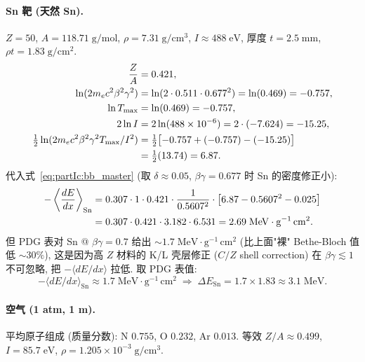 \paragraph{Sn 靶 (天然 Sn).} $Z = 50$, $A = 118.71\;\mathrm{g/mol}$, $\rho = 7.31\;\mathrm{g/cm^3}$, $I \approx 488\;\mathrm{eV}$, 厚度 $t = 2.5\;\mathrm{mm}$, $\rho t = 1.83\;\mathrm{g/cm^2}$.
\begin{align}
  \frac{Z}{A} &= 0.421, \\
  \ln(2 m_e c^2 \beta^2 \gamma^2) &= \ln(2 \cdot 0.511 \cdot 0.677^2)
  = \ln(0.469) = -0.757, \\
  \ln T_\mathrm{max} &= \ln(0.469) = -0.757, \\
  2 \ln I &= 2 \ln(488 \times 10^{-6}) = 2 \cdot (-7.624) = -15.25, \\
  \tfrac{1}{2}\ln(2 m_e c^2 \beta^2 \gamma^2 T_\mathrm{max}/I^2)
  &= \tfrac{1}{2}\bigl[-0.757 + (-0.757) - (-15.25)\bigr] \notag\\
  &= \tfrac{1}{2}(13.74) = 6.87.
\end{align}
代入式~\eqref{eq:partIc:bb_master} (取 $\delta \approx 0.05$, $\beta\gamma = 0.677$ 时 Sn 的密度修正小):
\begin{align}
  -\left\langle\frac{dE}{dx}\right\rangle_\mathrm{Sn}
  &= 0.307 \cdot 1 \cdot 0.421 \cdot \frac{1}{0.5607^2} \cdot
  \left[6.87 - 0.5607^2 - 0.025\right] \notag\\
  &= 0.307 \cdot 0.421 \cdot 3.182 \cdot 6.531
  = 2.69\;\mathrm{MeV \cdot g^{-1}\,cm^2}.
\end{align}
但 PDG 表对 Sn @ $\beta\gamma = 0.7$ 给出 $\sim 1.7\;\mathrm{MeV \cdot g^{-1}\,cm^2}$ (比上面"裸" Bethe-Bloch 值低 $\sim 30\%$), 这是因为高 $Z$ 材料的 K/L 壳层修正 ($C/Z$ shell correction) 在 $\beta\gamma \lesssim 1$ 不可忽略, 把 $-\langle dE/dx\rangle$ 拉低. 取 PDG 表值:
\begin{equation}
  -\langle dE/dx \rangle_\mathrm{Sn} \approx 1.7\;\mathrm{MeV \cdot g^{-1}\,cm^2}
  \;\Rightarrow\;
  \Delta E_\mathrm{Sn} = 1.7 \times 1.83 \approx 3.1\;\mathrm{MeV}.
  \label{eq:partIc:dE_Sn}
\end{equation}

\paragraph{空气 (1 atm, 1 m).} 平均原子组成 (质量分数): N $0.755$, O $0.232$, Ar $0.013$. 等效 $Z/A \approx 0.499$, $I = 85.7\;\mathrm{eV}$, $\rho = 1.205 \times 10^{-3}\;\mathrm{g/cm^3}$.

